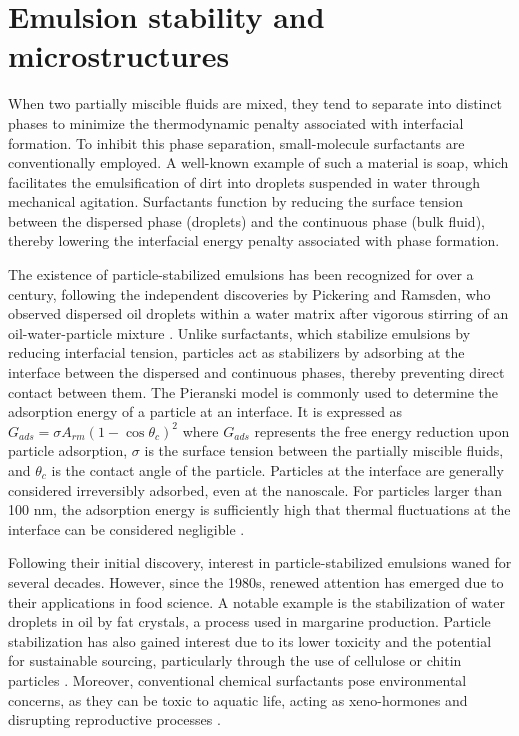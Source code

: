 \section{Emulsion stability and microstructures}

When two partially miscible fluids are mixed, they tend to separate into distinct phases to minimize the thermodynamic penalty associated with interfacial formation. 
To inhibit this phase separation, small-molecule surfactants are conventionally employed. A well-known example of such a material is soap, which facilitates the 
emulsification of dirt into droplets suspended in water through mechanical agitation. Surfactants function by reducing the surface tension between the dispersed 
phase (droplets) and the continuous phase (bulk fluid), thereby lowering the interfacial energy penalty associated with phase formation.

The existence of particle-stabilized emulsions has been recognized for over a century, following the independent discoveries by Pickering and Ramsden, who observed dispersed 
oil droplets within a water matrix after vigorous stirring of an oil-water-particle mixture \cite{ramsden_separation_1904, pickering_cxcvi.emulsions_1907}. Unlike surfactants, 
which stabilize emulsions by reducing interfacial tension, particles act as stabilizers by adsorbing at the interface between the dispersed and continuous phases, thereby 
preventing direct contact between them. The Pieranski model is commonly used to determine the adsorption 
energy of a particle at an interface. It is expressed as $ G_{ads} = \sigma A_{rm} (1 - \cos{\theta_c})^2 $ where $G_{ads}$ represents the free energy reduction upon particle 
adsorption, $\sigma$ is the surface tension between the partially miscible fluids, and $ \theta_c $ is the contact angle of the particle. Particles at the interface are 
generally considered irreversibly adsorbed, even at the nanoscale. For particles larger than 100 nm, the adsorption energy is sufficiently high that thermal fluctuations at 
the interface can be considered negligible \cite{cheung_molecular_2011}.

Following their initial discovery, interest in particle-stabilized emulsions waned for several decades. However, since the 1980s, renewed attention has emerged due to 
their applications in food science. A notable example is the stabilization of water droplets in oil by fat crystals, a process used in margarine production. Particle 
stabilization has also gained interest due to its lower toxicity and the potential for sustainable sourcing, particularly through the use of cellulose or chitin 
particles \cite{fujisawa_nanocellulose-stabilized_2017, tang_stimuli-responsive_2016, kalliola_carboxymethyl_2018}. Moreover, conventional chemical surfactants pose 
environmental concerns, as they can be toxic to aquatic life, acting as xeno-hormones and disrupting reproductive processes 
\cite{kaczerewska_environmental_2020, lechuga_acute_2016}.

